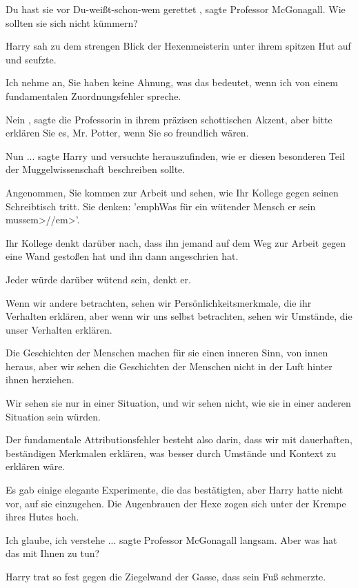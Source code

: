 \glqq Du hast sie vor Du-weißt-schon-wem gerettet\grqq{} , sagte Professor McGonagall.
\glqq Wie sollten sie sich nicht kümmern?\grqq{}

Harry sah zu dem strengen Blick der Hexenmeisterin unter
ihrem spitzen Hut auf und seufzte.

\glqq Ich nehme an, Sie haben keine Ahnung, was das bedeutet, wenn ich
von einem fundamentalen Zuordnungsfehler spreche.\grqq{}

\glqq Nein\grqq{} , sagte die Professorin in ihrem
präzisen schottischen Akzent, \glqq aber bitte erklären Sie es, Mr. Potter, wenn Sie so freundlich wären.\grqq{}

\glqq Nun ...\grqq{} sagte Harry und versuchte herauszufinden, wie er diesen besonderen Teil der
Muggelwissenschaft beschreiben sollte.

\glqq Angenommen, Sie kommen zur Arbeit und sehen, wie Ihr Kollege
gegen seinen Schreibtisch tritt. Sie denken: 'emph{Was für ein wütender Mensch er sein mussem>/}/em>'.

Ihr
Kollege denkt darüber nach, dass ihn jemand auf dem Weg zur Arbeit gegen eine Wand gestoßen hat und ihn dann angeschrien
hat.

Jeder würde darüber wütend sein, denkt er.

Wenn wir andere betrachten, sehen wir
Persönlichkeitsmerkmale, die ihr Verhalten erklären, aber wenn wir uns selbst betrachten, sehen wir Umstände, die unser
Verhalten erklären.

Die Geschichten der Menschen machen für sie einen inneren Sinn, von innen heraus, aber
wir sehen die Geschichten der Menschen nicht in der Luft hinter ihnen herziehen.

Wir sehen sie nur in einer
Situation, und wir sehen nicht, wie sie in einer anderen Situation sein würden.

Der fundamentale
Attributionsfehler besteht also darin, dass wir mit dauerhaften, beständigen Merkmalen erklären, was besser durch
Umstände und Kontext zu erklären wäre.\grqq{}

Es gab einige elegante Experimente, die das bestätigten, aber
Harry hatte nicht vor, auf sie einzugehen. Die Augenbrauen der Hexe zogen sich unter der Krempe ihres Hutes hoch.

\glqq Ich glaube, ich verstehe ...\grqq{} sagte Professor McGonagall langsam.
\glqq Aber was hat das
mit Ihnen zu tun?\grqq{}

Harry trat so fest gegen die Ziegelwand der Gasse, dass sein Fuß schmerzte.

